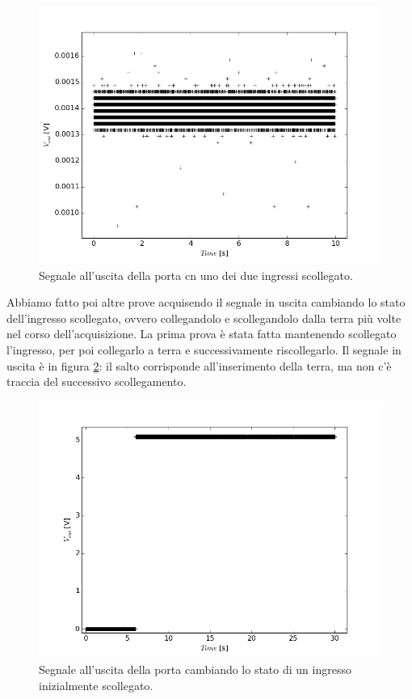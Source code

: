 \documentclass[journal, a4paper]{IEEEtran}
\begin{document}
\begin{figure}[htp]
\centering
\includegraphics[scale=.4]{es8_vero17}
\caption{Segnale all'uscita della porta cn uno dei due ingressi scollegato.}
\label{fig:es81}
\end{figure}

Abbiamo fatto poi altre prove acquisendo il segnale in uscita cambiando lo stato dell'ingresso scollegato, ovvero collegandolo e scollegandolo dalla terra più volte nel corso dell'acquisizione. La prima prova è stata fatta mantenendo scollegato l'ingresso, per poi collegarlo a terra e successivamente riscollegarlo. Il segnale in uscita è in figura \ref{fig:es82}: il salto corrisponde all'inserimento della terra, ma non c'è traccia del successivo scollegamento.

\begin{figure}[htp]
\centering
\includegraphics[scale=.4]{es8_falso-veroboh2}
\caption{Segnale all'uscita della porta cambiando lo stato di un ingresso inizialmente scollegato.}
\label{fig:es82}
\end{figure}
\end{document}

